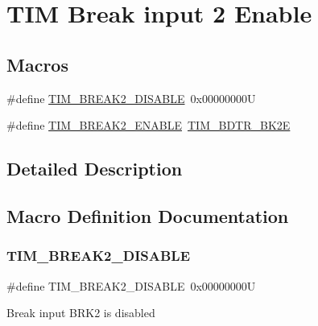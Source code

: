 \hypertarget{group___t_i_m___break2___input__enable__disable}{}\section{T\+IM Break input 2 Enable}
\label{group___t_i_m___break2___input__enable__disable}
\subsection*{Macros}
\begin{DoxyCompactItemize}
\item 
\#define \mbox{\hyperlink{group___t_i_m___break2___input__enable__disable_gac57b7f2a6a7dc5258e097f9ece77265b}{T\+I\+M\+\_\+\+B\+R\+E\+A\+K2\+\_\+\+D\+I\+S\+A\+B\+LE}}~0x00000000U
\item 
\#define \mbox{\hyperlink{group___t_i_m___break2___input__enable__disable_gafba1d741e2a78566f0bb15c435a63a4e}{T\+I\+M\+\_\+\+B\+R\+E\+A\+K2\+\_\+\+E\+N\+A\+B\+LE}}~\mbox{\hyperlink{group___peripheral___registers___bits___definition_ga50aff10d1577a94de8c4aa46cd2cbdb5}{T\+I\+M\+\_\+\+B\+D\+T\+R\+\_\+\+B\+K2E}}
\end{DoxyCompactItemize}


\subsection{Detailed Description}


\subsection{Macro Definition Documentation}
\mbox{\label{group___t_i_m___break2___input__enable__disable_gac57b7f2a6a7dc5258e097f9ece77265b}} 
\subsubsection{\texorpdfstring{TIM\_BREAK2\_DISABLE}{TIM\_BREAK2\_DISABLE}}
{\footnotesize\ttfamily \#define T\+I\+M\+\_\+\+B\+R\+E\+A\+K2\+\_\+\+D\+I\+S\+A\+B\+LE~0x00000000U}

Break input B\+R\+K2 is disabled \mbox{\label{group___t_i_m___break2___input__enable__disable_gafba1d741e2a78566f0bb15c435a63a4e}} 
